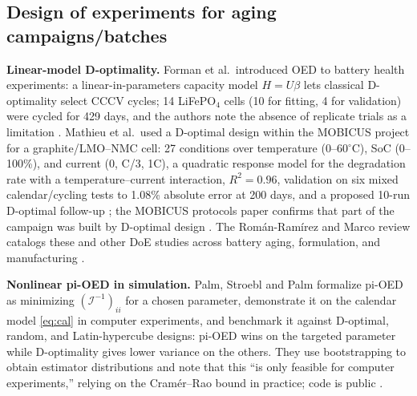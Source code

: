 \documentclass[11pt,letterpaper]{article}
\begin{document}
\subsection{Design of experiments for aging campaigns/batches}\label{sec:lit-aging}
\textbf{Linear-model D-optimality.} Forman et al.\ introduced OED to battery health experiments: a linear-in-parameters capacity model $H=U\beta$ lets classical D-optimality select CCCV cycles; 14 LiFePO$_4$ cells (10 for fitting, 4 for validation) were cycled for 429 days, and the authors note the absence of replicate trials as a limitation \cite{forman2012}. Mathieu et al.\ used a D-optimal design within the MOBICUS project for a graphite/LMO--NMC cell: 27 conditions over temperature (0--60$^\circ$C), SoC (0--100\%), and current (0, C/3, 1C), a quadratic response model for the degradation rate with a temperature--current interaction, $R^2=0.96$, validation on six mixed calendar/cycling tests to 1.08\% absolute error at 200 days, and a proposed 10-run D-optimal follow-up \cite{mathieu2017}; the MOBICUS protocols paper confirms that part of the campaign was built by D-optimal design \cite{benmarzouk2016}. The Rom\'an-Ram\'irez and Marco review catalogs these and other DoE studies across battery aging, formulation, and manufacturing \cite{roman2022}.

\textbf{Nonlinear pi-OED in simulation.} Palm, Stroebl and Palm formalize pi-OED as minimizing $(\mathcal I^{-1})_{ii}$ for a chosen parameter, demonstrate it on the calendar model \eqref{eq:cal} in computer experiments, and benchmark it against D-optimal, random, and Latin-hypercube designs: pi-OED wins on the targeted parameter while D-optimality gives lower variance on the others. They use bootstrapping to obtain estimator distributions and note that this ``is only feasible for computer experiments,'' relying on the Cram\'er--Rao bound in practice; code is public \cite{palm2022}.
\end{document}
